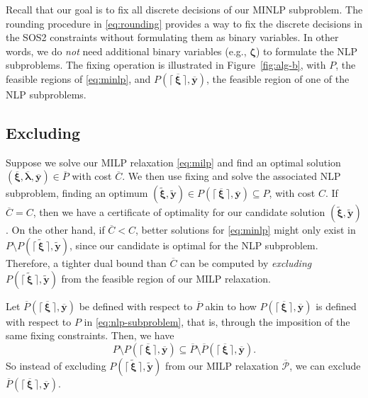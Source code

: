 \documentclass[pdflatex,sn-mathphys-num]{sn-jnl}%
\newcommand{\new}[1]{#1}
\begin{document}
\new{%
Recall that our goal is to fix all discrete decisions of our MINLP subproblem.
The rounding procedure in \eqref{eq:rounding} provides a way to fix the discrete decisions in the SOS2 constraints without formulating them as binary variables. 
In other words, we do \emph{not} need additional binary variables (e.g., $\bm{\zeta}$) to formulate the NLP subproblems. 
The fixing operation is illustrated in Figure~\ref{fig:alg-b}, with $P$, the feasible regions of \ref{eq:minlp}, and ${P}(\lceil\, \overline{\bm{\xi}} \,\rceil ,\overline{\bm{y}})$, the feasible region of one of the NLP subproblems.
}


\subsection{Excluding}\label{sec:excluding}

\new{%
Suppose we solve our MILP relaxation \ref{eq:milp} and find an optimal solution $(\overline{\bm{\xi}},\overline{\bm{\lambda}},\overline{\bm{y}}) \in \overline{P}$ with cost $\overline{C}$.
We then use fixing and solve the associated NLP subproblem, finding an optimum $(\widetilde{\bm{\xi}},\widetilde{\bm{y}}) \in P(\lceil\,\overline{\bm{\xi}} \,\rceil,\overline{\bm{y}})\subseteq P$, with cost $C$.
If $\overline{C} = C$, then we have a certificate of optimality for our candidate solution $(\widetilde{\bm{\xi}},\widetilde{\bm{y}})$.
On the other hand, if $\overline{C} < C$, better solutions for \ref{eq:minlp} might only exist in $P \setminus P(\lceil\,\widetilde{\bm{\xi}} \,\rceil,\widetilde{\bm{y}})$, since our candidate is optimal for the NLP subproblem.
Therefore, a tighter dual bound than $\overline{C}$ can be computed by \emph{excluding} $P(\lceil\,\widetilde{\bm{\xi}} \,\rceil,\widetilde{\bm{y}})$ from the feasible region of our MILP relaxation.
}

\new{%
Let $\overline{P}(\lceil\,\overline{\bm{\xi}} \,\rceil,\overline{\bm{y}})$ be defined with respect to $\overline{P}$ akin to how $P(\lceil\,\overline{\bm{\xi}} \,\rceil,\overline{\bm{y}})$ is defined with respect to $P$ in \eqref{eq:nlp-subproblem}, that is, through the imposition of the same fixing constraints.
Then, we have
\begin{equation}
P \setminus P(\lceil\,\overline{\bm{\xi}} \,\rceil,\overline{\bm{y}}) \subseteq \overline{P} \setminus \overline{P}(\lceil\,\overline{\bm{\xi}} \,\rceil,\overline{\bm{y}}) %
.\end{equation}
So instead of excluding $P(\lceil\,\widetilde{\bm{\xi}} \,\rceil,\widetilde{\bm{y}})$ from our MILP relaxation $\overline{\mathcal{P}}$, we can exclude $\overline{P}(\lceil\,\overline{\bm{\xi}} \,\rceil,\overline{\bm{y}})$.
}
\end{document}
